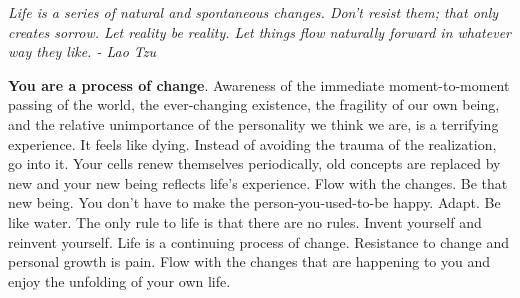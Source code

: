 \documentclass[a4paper,hidelinks]{article}
\begin{document}
\newpage

\begin{center}
\textit{
Life is a series of natural and spontaneous changes. Don't resist them; that only creates sorrow. Let reality be reality. Let things flow naturally forward in whatever way they like. - Lao Tzu
}
\end{center}

\textbf{You are a process of change}.
Awareness of the immediate moment-to-moment passing of the world, the ever-changing existence, the fragility of our own being, and the relative unimportance of the personality we think we are, is a terrifying experience.
It feels like dying.
Instead of avoiding the trauma of the realization, go into it.
Your cells renew themselves periodically, old concepts are replaced by new and your new being reflects life’s experience.
Flow with the changes.
Be that new being.
You don’t have to make the person-you-used-to-be happy.
Adapt.
Be like water.
The only rule to life is that there are no rules.
Invent yourself and reinvent yourself.
Life is a continuing process of change.
Resistance to change and personal growth is pain.
Flow with the changes that are happening to you and enjoy the unfolding of your own life.


\end{document}
